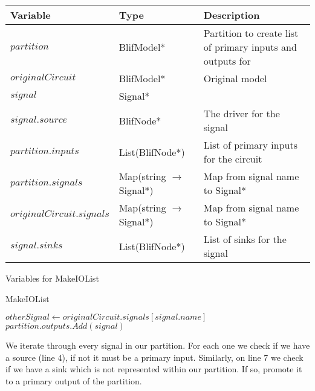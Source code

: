 \documentclass[12pt,final,oneside]{article} %
\begin{document}
\newpage
\begin{algorithm}
   \begin{center}
        \begin{tabularx}{\linewidth}{llX}
        \toprule
        Variable & Type & Description\\
        \midrule
        $partition$ & BlifModel* & Partition to create list of primary inputs and outputs for\\
        $originalCircuit$ & BlifModel* & Original model \\
        $signal$ & Signal* & \\
        $signal.source$ & BlifNode* & The driver for the signal \\
        $partition.inputs$ & List(BlifNode*) & List of primary inputs for the circuit \\
        $partition.signals$ & Map(string $\to$ Signal*) & Map from signal name to Signal* \\
        $originalCircuit.signals$ & Map(string $\to$ Signal*) & Map from signal name to Signal* \\
        $signal.sinks$ & List(BlifNode*) & List of sinks for the signal \\

        \bottomrule
        \end{tabularx}
        \caption{Variables for MakeIOList}
        \label{varMakeiolist}
    \end{center}
   \caption{MakeIOList}\label{makeiolist}
   \begin{algorithmic}[1]
                
               \EndIf
               \State $otherSignal \gets originalCircuit.signals[signal.name]$ 
                
                  \State $partition.outputs.Add(signal)$
               \EndIf
            \EndFor
         \EndProcedure
   \end{algorithmic}
\end{algorithm}
We iterate through every signal in our partition. For each one we check if we have a source (line 4), if not it must be a primary input. Similarly, on line 7 we check if we have a sink which is not represented within our partition. If so, promote it to a primary output of the partition.
\end{document}
